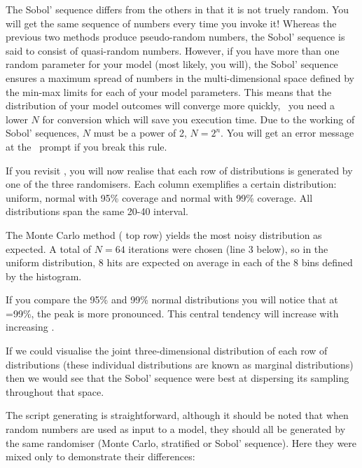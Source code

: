 The Sobol' sequence differs from the others in that it is not truely random. You will get the same sequence of numbers every time you invoke it! Whereas the previous two methods produce pseudo-random numbers, the Sobol' sequence is said to consist of quasi-random numbers. However, if you have more than one random parameter for your model (most likely, you will), the Sobol' sequence ensures a maximum spread of numbers in the multi-dimensional space defined by the min-max limits for each of your model parameters. This means that the distribution of your model outcomes will converge more quickly, \ie\ you need a lower $N$ for conversion which will save you execution time. Due to the working of Sobol' sequences, $N$ must be a power of 2, $N=2^n$. You will get an error message at the \US\ prompt if you break this rule.

If you revisit , you will now realise that each row of  distributions is generated by one of the three randomisers. Each column exemplifies a certain distribution: uniform, normal with 95\% coverage and normal with 99\% coverage. All distributions span the same 20-40 interval.

The Monte Carlo method ( top row) yields the most noisy distribution as expected. A total of $N=64$ iterations were chosen (line 3 below), so in the uniform distribution, 8 hits are expected on average in each of the 8 bins defined by the histogram. 

If you compare the 95\% and 99\% normal distributions you will notice that at =99\%, the peak is more pronounced. This central tendency will increase with increasing .

If we could visualise the joint three-dimensional distribution of each row of distributions (these individual distributions are known as marginal distributions) then we would see that the Sobol' sequence were best at dispersing its sampling throughout that space.

The script generating  is straightforward, although it should be noted that when random numbers are used as input to a model, they should all be generated by the same randomiser (Monte Carlo, stratified or Sobol' sequence). Here they were mixed only to demonstrate their differences:

